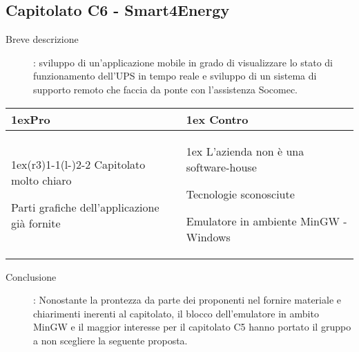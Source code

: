 \subsection{Capitolato C6 - Smart4Energy}
\begin{description}
\item [Breve descrizione]: sviluppo di un’applicazione mobile in grado di visualizzare lo stato di funzionamento dell’UPS in tempo reale e sviluppo di un sistema di supporto remoto che faccia da ponte con l'assistenza Socomec.
\end{description}
\begin{table}[h]
\begin{tabularx}{\linewidth}{>{\parskip1ex}X@{\kern4\tabcolsep}>{\parskip1ex}X}
\hfil\bfseries Pro
&
\hfil\bfseries Contro
\\\cmidrule(r{3\tabcolsep}){1-1}\cmidrule(l{-\tabcolsep}){2-2}
Capitolato molto chiaro \par
Parti grafiche dell'applicazione già fornite
&
L'azienda non è una software-house \par
Tecnologie sconosciute \par
Emulatore in ambiente MinGW - Windows \\
\end{tabularx}
\end{table}
\begin{description}
	\item [Conclusione]: Nonostante la prontezza da parte dei proponenti nel fornire materiale e chiarimenti inerenti al capitolato, il blocco dell'emulatore in ambito MinGW e il maggior interesse per il capitolato C5 hanno portato il gruppo a non scegliere la seguente proposta.
\end{description}
